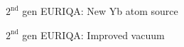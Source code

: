 \documentclass{beamer}
\begin{document}


\begin{frame}{$2^{\text{nd}}$ gen EURIQA: New Yb atom source}
  \begin{center}
    \begin{tikzpicture}
    \end{tikzpicture}
  \end{center}
\end{frame}



\begin{frame}{$2^{\text{nd}}$ gen EURIQA: Improved vacuum}
  \begin{center}
    \begin{tikzpicture}
    \end{tikzpicture}
  \end{center}
\end{frame}

\end{document}
